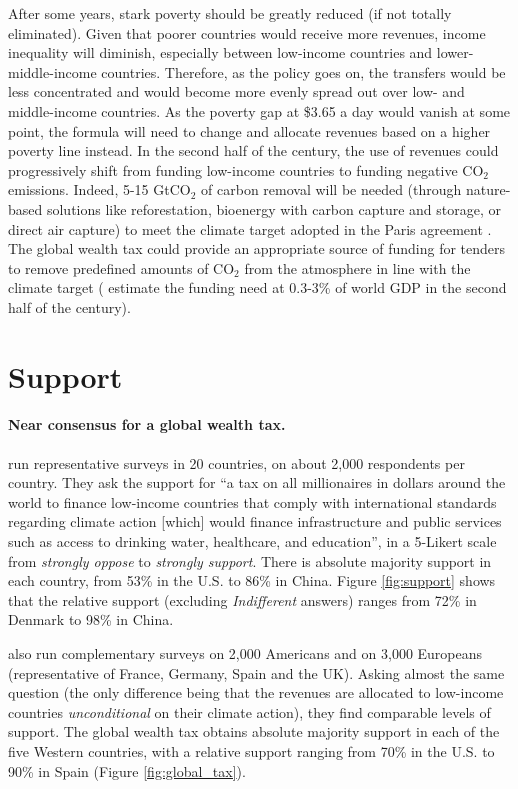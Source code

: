 \documentclass[12pt,english]{article}
\begin{document}
After some years, stark poverty should be greatly reduced (if not totally eliminated). Given that poorer countries would receive more revenues, income inequality will diminish, especially between low-income countries and lower-middle-income countries. Therefore, as the policy goes on, the transfers would be less concentrated and would become more evenly spread out over low- and middle-income countries. As the poverty gap at \$3.65 a day would vanish at some point, the formula will need to change and allocate revenues based on a higher poverty line instead. In the second half of the century, the use of revenues could progressively shift from funding low-income countries to funding negative CO$_\text{2}$ emissions. Indeed, 5-15 GtCO$_\text{2}$ of carbon removal will be needed (through nature-based solutions like reforestation, bioenergy with carbon capture and storage, or direct air capture) to meet the climate target adopted in the Paris agreement \citep{ipcc_wgiii_2022}. The global wealth tax could provide an appropriate source of funding for tenders to remove predefined amounts of CO$_\text{2}$ from the atmosphere in line with the climate target (\citet{edenhofer_governance_2023} estimate the funding need at 0.3-3\% of world GDP in the second half of the century). 

\section{Support}\label{sec:support}

\paragraph{Near consensus for a global wealth tax.} \citet{fabre_international_2023} run representative surveys in 20 countries, on about 2,000 respondents per country. They ask the support for
``a tax on all millionaires in dollars around the world to finance low-income countries that comply with international standards regarding climate action [which] would finance infrastructure and public services such as access to drinking water, healthcare, and education'', in a 5-Likert scale from \textit{strongly oppose} to \textit{strongly support}. There is absolute majority support in each country, from 53\% in the U.S. to 86\% in China. Figure \ref{fig:support} shows that the relative support (excluding \textit{Indifferent} answers) ranges from 72\% in Denmark to 98\% in China. 


\citet{fabre_international_2023} also run complementary surveys on 2,000 Americans and on 3,000 Europeans (representative of France, Germany, Spain and the UK). Asking almost the same question (the only difference being that the revenues are allocated to low-income countries \textit{unconditional} on their climate action), they find comparable levels of support. The global wealth tax obtains absolute majority support in each of the five Western countries, with a relative support ranging from 70\% in the U.S. to 90\% in Spain (Figure \ref{fig:global_tax}). %
\end{document}
